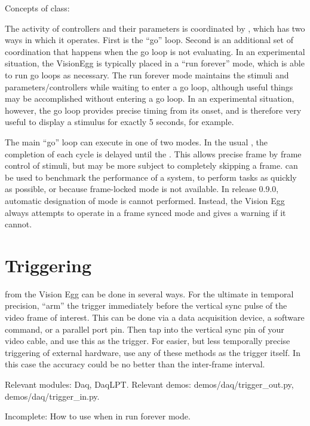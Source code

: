 Concepts of  class:

The activity of controllers and their parameters is coordinated by
, which has two ways in which it operates.  First
is the ``go'' loop.  Second is an additional set of coordination that
happens when the go loop is not evaluating. In an experimental
situation, the VisionEgg is typically placed in a ``run forever''
mode, which is able to run go loops as necessary.  The run forever
mode maintains the stimuli and parameters/controllers while waiting to
enter a go loop, although useful things may be accomplished without
entering a go loop.  In an experimental situation, however, the go
loop provides precise timing from its onset, and is therefore very
useful to display a stimulus for exactly 5 seconds, for example.

The main ``go'' loop can execute in one of two modes.  In the usual
, the completion of each cycle is delayed
until the . This allows precise
frame by frame control of stimuli, but may be more subject to
completely skipping a frame.   can be used to
benchmark the performance of a system, to perform tasks as quickly as
possible, or because frame-locked mode is not available. In release
0.9.0, automatic designation of mode is cannot performed.  Instead,
the Vision Egg always attempts to operate in a frame synced mode and
gives a warning if it cannot.

\section{Triggering}

 from the Vision Egg can be done in
several ways. For the ultimate in temporal precision, ``arm'' the
trigger immediately before the vertical sync pulse of the video frame
of interest. This can be done via a data acquisition device, a
software command, or a parallel port pin. Then tap into the vertical
sync pin of your video cable, and use this as the trigger. For easier,
but less temporally precise triggering of external hardware, use any
of these methods as the trigger itself.  In this case the accuracy
could be no better than the inter-frame interval.

Relevant modules: Daq, DaqLPT.  Relevant demos:
demos/daq/trigger_out.py, demos/daq/trigger_in.py.

 Incomplete: How to use
 when in run forever mode.

